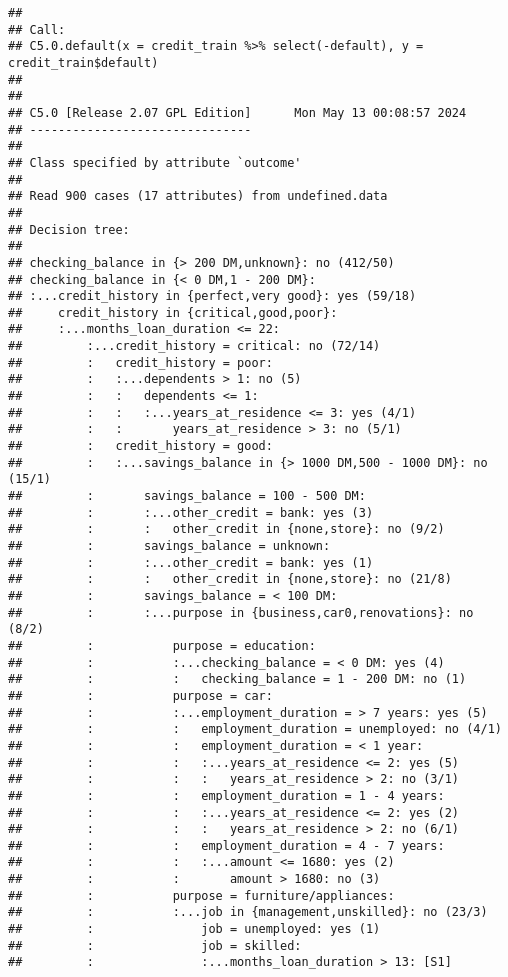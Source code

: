 \documentclass[
]{article}
\begin{document}
\begin{verbatim}
## 
## Call:
## C5.0.default(x = credit_train %>% select(-default), y = credit_train$default)
## 
## 
## C5.0 [Release 2.07 GPL Edition]      Mon May 13 00:08:57 2024
## -------------------------------
## 
## Class specified by attribute `outcome'
## 
## Read 900 cases (17 attributes) from undefined.data
## 
## Decision tree:
## 
## checking_balance in {> 200 DM,unknown}: no (412/50)
## checking_balance in {< 0 DM,1 - 200 DM}:
## :...credit_history in {perfect,very good}: yes (59/18)
##     credit_history in {critical,good,poor}:
##     :...months_loan_duration <= 22:
##         :...credit_history = critical: no (72/14)
##         :   credit_history = poor:
##         :   :...dependents > 1: no (5)
##         :   :   dependents <= 1:
##         :   :   :...years_at_residence <= 3: yes (4/1)
##         :   :       years_at_residence > 3: no (5/1)
##         :   credit_history = good:
##         :   :...savings_balance in {> 1000 DM,500 - 1000 DM}: no (15/1)
##         :       savings_balance = 100 - 500 DM:
##         :       :...other_credit = bank: yes (3)
##         :       :   other_credit in {none,store}: no (9/2)
##         :       savings_balance = unknown:
##         :       :...other_credit = bank: yes (1)
##         :       :   other_credit in {none,store}: no (21/8)
##         :       savings_balance = < 100 DM:
##         :       :...purpose in {business,car0,renovations}: no (8/2)
##         :           purpose = education:
##         :           :...checking_balance = < 0 DM: yes (4)
##         :           :   checking_balance = 1 - 200 DM: no (1)
##         :           purpose = car:
##         :           :...employment_duration = > 7 years: yes (5)
##         :           :   employment_duration = unemployed: no (4/1)
##         :           :   employment_duration = < 1 year:
##         :           :   :...years_at_residence <= 2: yes (5)
##         :           :   :   years_at_residence > 2: no (3/1)
##         :           :   employment_duration = 1 - 4 years:
##         :           :   :...years_at_residence <= 2: yes (2)
##         :           :   :   years_at_residence > 2: no (6/1)
##         :           :   employment_duration = 4 - 7 years:
##         :           :   :...amount <= 1680: yes (2)
##         :           :       amount > 1680: no (3)
##         :           purpose = furniture/appliances:
##         :           :...job in {management,unskilled}: no (23/3)
##         :               job = unemployed: yes (1)
##         :               job = skilled:
##         :               :...months_loan_duration > 13: [S1]

\end{verbatim}
\end{document}
